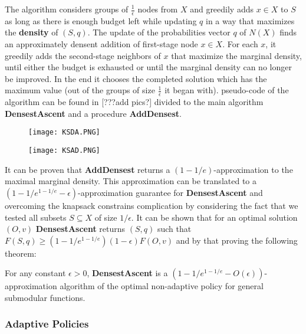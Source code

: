 The algorithm considers groups of $\frac{1}{\epsilon}$ nodes from $X$ and greedily adds $x \in X$ to $S$ as long as there is enough budget left while updating $q$ in a way that maximizes the \textbf{density} of $(S,q)$. The update of the probabilities vector $q$ of $N(X)$ finds an approximately densent addition of first-stage node $x \in X$.  For each $x$, it greedily adds the second-stage neighbors of $x$ that maximize the marginal density, until either the budget is exhausted or until the marginal density can no longer be improved.  In the end it chooses the completed solution which has the maximum value (out of the groups of size $\frac{1}{\epsilon}$ it began with). pseudo-code of the algorithm can be found in [???add pics?] divided to the main algorithm \textbf{DensestAscent} and a procedure \textbf{AddDensest}. 
\begin{figure}[h]
\texttt{[image: KSDA.PNG]}
\centering
\end{figure}
\begin{figure}[h]
\texttt{[image: KSAD.PNG]}
\centering
\end{figure}
It can be proven that \textbf{AddDensest} returns a $(1 - 1/e)$-approximation to the maximal marginal density. This approximation can be translated to a $(1 - 1/e^{1 - 1/e} - \epsilon)$-approximation guarantee for \textbf{DensestAscent} and overcoming the knapsack constrains complication by considering the fact that we tested all subsets $S \subseteq X$ of size $1/\epsilon$. It can be shown that for an optimal solution $(O, v)$ \textbf{DensestAscent} returns $(S, q)$ such that $F(S, q) \ge (1 − 1/e^{1−1/e})(1 − \epsilon)F(O, v)$ and by that proving the following theorem: 
\begin{theorem} For any constant $\epsilon > 0$, \textbf{DensestAscent} is a $(1 - 1/e^{1 - 1/e} - O(\epsilon))$-approximation algorithm of the optimal non-adaptive policy for general submodular functions.
\end{theorem}

\subsubsection{Adaptive Policies}

